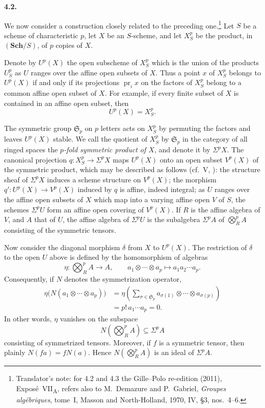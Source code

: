 
\medskip
\noindent\textbf{4.2.}
\label{sga3:VIIA:4.2}

We now consider a construction closely related to the preceding
one.\footnote{Translator's note: for 4.2 and 4.3 the Gille--Polo
re-edition (2011), Expos\'e~VII\textsubscript{A}, refers also to
M.~Demazure and P.~Gabriel, \textit{Groupes alg\'ebriques}, tome~I,
Masson and North-Holland, 1970, IV, \S3, nos.~4--6.} Let \(S\) be a scheme of characteristic \(p\), let \(X\) be
an \(S\)-scheme, and let \(X_S^p\) be the product, in
\((\mathbf{Sch}/S)\), of \(p\) copies of \(X\).

Denote by \(U^p(X)\) the open subscheme of \(X_S^p\) which is the
union of the products \(U_S^p\) as \(U\) ranges over the affine
open subsets of \(X\). Thus a point \(x\) of \(X_S^p\) belongs to
\(U^p(X)\) if and only if its projections
\(\operatorname{pr}_i x\) on the factors of \(X_S^p\) belong to a
common affine open subset of \(X\). For example, if every finite
subset of \(X\) is contained in an affine open subset, then
\[
  U^p(X)=X_S^p.
\]

The symmetric group \(\mathfrak S_p\) on \(p\) letters acts on
\(X_S^p\) by permuting the factors and leaves \(U^p(X)\) stable.
We call the quotient of \(X_S^p\) by \(\mathfrak S_p\) in the
category of all ringed spaces the \emph{\(p\)-fold symmetric product
of \(X\)}, and denote it by \(\Sigma^p X\). The canonical projection
\(q:X_S^p\to\Sigma^p X\) maps \(U^p(X)\) onto an open subset
\(V^p(X)\) of the symmetric product, which may be described as
follows (cf.\ V, ): the structure sheaf of \(\Sigma^p X\)
induces a scheme structure on \(V^p(X)\); the morphism
\(q':U^p(X)\to V^p(X)\) induced by \(q\) is affine, indeed integral; as
\(U\) ranges
over the affine open subsets of \(X\) which map into a varying
affine open \(V\) of \(S\), the schemes \(\Sigma^p U\) form an
affine open covering of \(V^p(X)\). If \(R\) is the affine algebra
of \(V\), and \(A\) that of \(U\), the affine algebra of
\(\Sigma^p U\) is the subalgebra \(\Sigma^p A\) of
\(\bigotimes_R^p A\) consisting of the symmetric tensors.

Now consider the diagonal morphism \(\delta\) from \(X\) to
\(U^p(X)\). The restriction of \(\delta\) to the open \(U\) above is
defined by the homomorphism of algebras
\[
  \eta:\bigotimes_R^p A\longrightarrow A,
  \qquad
  a_1\otimes\cdots\otimes a_p
  \longmapsto
  a_1a_2\cdots a_p.
\]
Consequently, if \(N\) denotes the symmetrization operator,
\[
\begin{aligned}
  \eta\bigl(N(a_1\otimes\cdots\otimes a_p)\bigr)
  &=
  \eta\left(
    \sum_{\sigma\in\mathfrak S_p}
      a_{\sigma(1)}\otimes\cdots\otimes a_{\sigma(p)}
  \right) \\
  &=
  p!\,a_1\cdots a_p
  =
  0.
\end{aligned}
\]
In other words, \(\eta\) vanishes on the subspace
\[
  N\!\left(\bigotimes_R^p A\right)
  \subseteq
  \Sigma^p A
\]
consisting of symmetrized tensors. Moreover, if \(f\) is a
symmetric tensor, then plainly \(N(fa)=fN(a)\). Hence
\(N(\bigotimes_R^p A)\) is an ideal of \(\Sigma^p A\).

